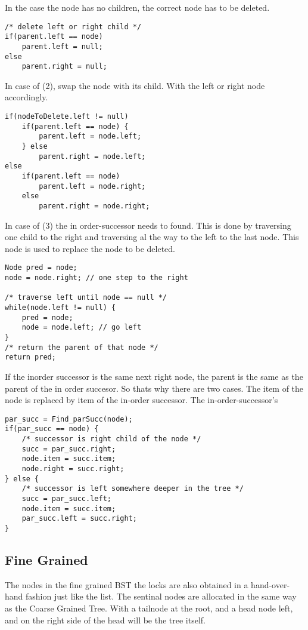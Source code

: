\documentclass[10pt,a4paper]{article}
\begin{document}
In the case the node has no children, the correct node has to be deleted.
\begin{lstlisting}
/* delete left or right child */
if(parent.left == node) 
    parent.left = null;
else
    parent.right = null;
\end{lstlisting}

In case of (2), swap the node with its child. With the left or right node accordingly.
\begin{lstlisting}
if(nodeToDelete.left != null)
    if(parent.left == node) {
        parent.left = node.left;
    } else
        parent.right = node.left;
else 
    if(parent.left == node)
        parent.left = node.right;
    else
        parent.right = node.right;
\end{lstlisting}

In case of (3) the in order-successor needs to found. This is done by traversing one child to the right and traversing al the way to the left to the last node. This node is used to replace the node to be deleted.

\begin{lstlisting}
Node pred = node;
node = node.right; // one step to the right

/* traverse left until node == null */
while(node.left != null) {
    pred = node;
    node = node.left; // go left
}
/* return the parent of that node */
return pred;
\end{lstlisting}

If the inorder successor is the same next right node, the parent is the same as the parent of the in order succesor. So thats why there are two cases. The item of the node is replaced by item of the in-order successor. The in-order-successor's 
\begin{lstlisting}
par_succ = Find_parSucc(node);
if(par_succ == node) {
    /* successor is right child of the node */
    succ = par_succ.right;
    node.item = succ.item;
    node.right = succ.right;
} else {
    /* successor is left somewhere deeper in the tree */
    succ = par_succ.left;
    node.item = succ.item;
    par_succ.left = succ.right;
}
\end{lstlisting}


\subsection{Fine Grained}
The nodes in the fine grained BST the locks are also obtained in a hand-over-hand fashion just like the list. The sentinal nodes are allocated in the same way as the Coarse Grained Tree. With a tailnode at the root, and a head node left, and on the right side of the head will be the tree itself. 
\end{document}
